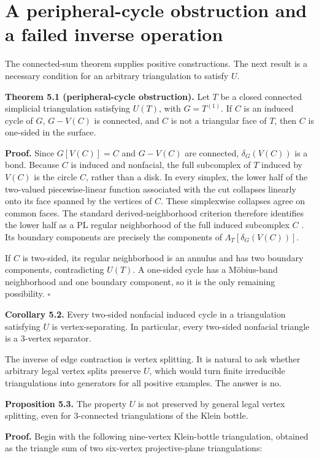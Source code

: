 \documentclass[11pt]{article}
\begin{document}
\section{A peripheral-cycle obstruction and a failed inverse operation}


The connected-sum theorem supplies positive constructions. The next result is
a necessary condition for an arbitrary triangulation to satisfy $U$.

\textbf{Theorem 5.1 (peripheral-cycle obstruction).} Let $T$ be a closed connected
simplicial triangulation satisfying $U(T)$, with $G=T^{(1)}$. If $C$ is an
induced cycle of $G$, $G-V(C)$ is connected, and $C$ is not a triangular face
of $T$, then $C$ is one-sided in the surface.

\textbf{Proof.} Since $G[V(C)]=C$ and $G-V(C)$ are connected,
$\delta_G(V(C))$ is a bond. Because $C$ is induced and nonfacial, the full
subcomplex of $T$ induced by $V(C)$ is the circle $C$, rather than a disk.
In every simplex, the lower half of the two-valued piecewise-linear function
associated with the cut collapses linearly onto its face spanned by the
vertices of $C$. These simplexwise collapses agree on common faces. The
standard derived-neighborhood criterion therefore identifies the lower half
as a PL regular neighborhood of the full induced subcomplex $C$ \cite{mohar-thomassen}. Its
boundary components are precisely the components of
$\Lambda_T[\delta_G(V(C))]$.

If $C$ is two-sided, its regular neighborhood is an annulus and has two
boundary components, contradicting $U(T)$. A one-sided cycle has a Möbius-band
neighborhood and one boundary component, so it is the only remaining
possibility. $\square$

\textbf{Corollary 5.2.} Every two-sided nonfacial induced cycle in a triangulation
satisfying $U$ is vertex-separating. In particular, every two-sided nonfacial
triangle is a $3$-vertex separator.

The inverse of edge contraction is vertex splitting. It is natural to ask
whether arbitrary legal vertex splits preserve $U$, which would turn finite
irreducible triangulations into generators for all positive examples. The
answer is no.

\textbf{Proposition 5.3.} The property $U$ is not preserved by general legal vertex
splitting, even for $3$-connected triangulations of the Klein bottle.

\textbf{Proof.} Begin with the following nine-vertex Klein-bottle triangulation,
obtained as the triangle sum of two six-vertex projective-plane
triangulations:
\end{document}
